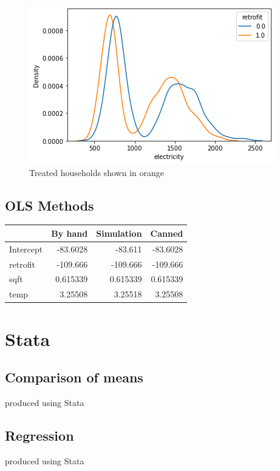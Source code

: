 \documentclass{article}
\begin{document}
\begin{figure}[ht]
    \centering
    \includegraphics[scale = 0.7]{kdeplot.png}
    \caption{Treated households shown in orange}
\end{figure}

\vspace{5cm}


\subsection{OLS Methods}

\begin{longtable}{lrrr}
\hline
           &     By hand &   Simulation &      Canned \\
\hline
\endhead
 Intercept &  -83.6028   &   -83.611    &  -83.6028   \\
 retrofit  & -109.666    &  -109.666    & -109.666    \\
 sqft      &    0.615339 &     0.615339 &    0.615339 \\
 temp      &    3.25508  &     3.25518  &    3.25508  \\
\hline
\end{longtable}


\section{Stata}

\subsection{Comparison of means}


\begin{table}[ht]
    \centering
    
    \caption{produced using Stata}
    \label{tab:statasummary}
\end{table}

\subsection{Regression}

\begin{table}[ht]
    \centering
    
    \caption{produced using Stata}
    \label{tab:statasummary}
\end{table}
\end{document}
